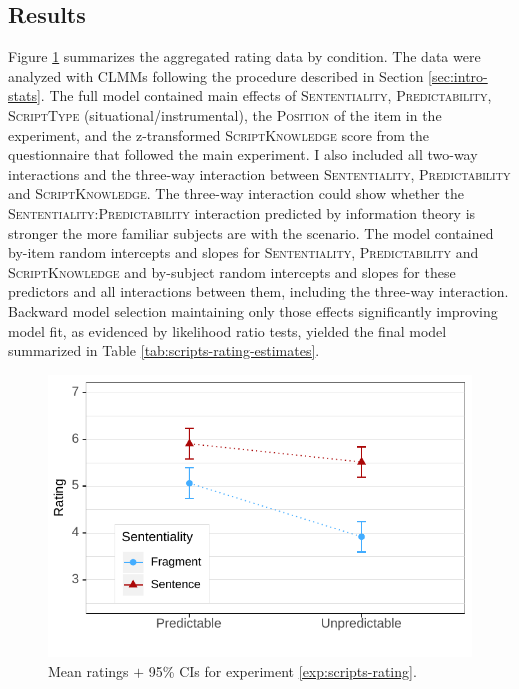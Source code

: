 \subsection{Results}
Figure \ref{fig:scripts-rating-means} summarizes the aggregated rating data by condition. The data were analyzed with CLMMs following the procedure described in Section \ref{sec:intro-stats}. The full model contained main effects of \textsc{Sententiality}, \textsc{Predictability}, \textsc{ScriptType} (situational/instrumental), the \textsc{Position} of the item in the experiment, and the z-transformed \textsc{ScriptKnowledge} score from the questionnaire that followed the main experiment. I also included all two-way interactions and the three-way interaction between \textsc{Sententiality}, \textsc{Predictability} and \textsc{ScriptKnowledge}. The three-way interaction could show whe\-ther the \textsc{Sententiali\-ty:Predicta\-bility} interaction predicted by information theory is stronger the more familiar subjects are with the scenario. The model contained by-item random intercepts and slopes for \textsc{Sententiality}, \textsc{Predictability} and \textsc{ScriptKnow\-ledge} and by-subject random intercepts and slopes for these predictors and all interactions between them, including the three-way interaction. Backward model selection maintaining only those effects significantly improving model fit, as evidenced by likelihood ratio tests, yielded the final model summarized in Table \ref{tab:scripts-rating-estimates}. 

\begin{figure}[t]
\includegraphics[scale=1]{figures/scr_rating_estimates}
 \caption{Mean ratings $+$ 95\% CIs for experiment \ref{exp:scripts-rating}. \label{fig:scripts-rating-means}}
\end{figure}

